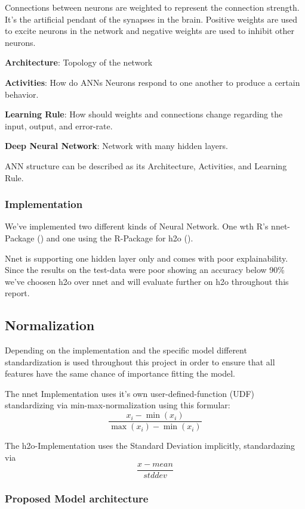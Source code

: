 \documentclass[]{article}
\begin{document}
Connections between neurons are weighted to represent the connection
strength. It's the artificial pendant of the synapses in the brain.
Positive weights are used to excite neurons in the network and negative
weights are used to inhibit other neurons.

\textbf{Architecture}: Topology of the network

\textbf{Activities}: How do ANNs Neurons respond to one another to
produce a certain behavior.

\textbf{Learning Rule}: How should weights and connections change
regarding the input, output, and error-rate.

\textbf{Deep Neural Network}: Network with many hidden layers.

ANN structure can be described as its Architecture, Activities, and
Learning Rule.

\subsubsection{Implementation}\label{implementation}

We've implemented two different kinds of Neural Network. One wth R's
nnet-Package (\cite{nnet}) and one using the R-Package for h2o
(\cite{h2o}).

Nnet is supporting one hidden layer only and comes with poor
explainability. Since the results on the test-data were poor showing an
accuracy below 90\% we've choosen h2o over nnet and will evaluate
further on h2o throughout this report.

\subsection{Normalization}\label{normalization}

Depending on the implementation and the specific model different
standardization is used throughout this project in order to ensure that
all features have the same chance of importance fitting the model.

The nnet Implementation uses it's own user-defined-function (UDF)
standardizing via min-max-normalization using this formular: \[
\frac{x_i-\min(x_i)}{\max(x_i)-\min(x_i)}
\]

The h2o-Implementation uses the Standard Deviation implicitly,
standardazing via \[
\frac{x-mean}{stddev}
\]

\subsubsection{Proposed Model
architecture}\label{proposed-model-architecture}
\end{document}
